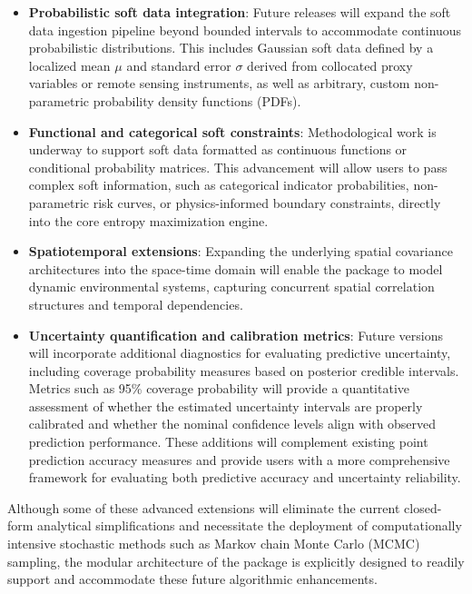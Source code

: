 \begin{itemize}
\item
  \textbf{Probabilistic soft data integration}: Future releases will expand the soft data ingestion pipeline beyond bounded intervals to accommodate continuous probabilistic distributions. This includes Gaussian soft data defined by a localized mean \(\mu\) and standard error \(\sigma\) derived from collocated proxy variables or remote sensing instruments, as well as arbitrary, custom non-parametric probability density functions (PDFs).
\item
  \textbf{Functional and categorical soft constraints}: Methodological work is underway to support soft data formatted as continuous functions or conditional probability matrices. This advancement will allow users to pass complex soft information, such as categorical indicator probabilities, non-parametric risk curves, or physics-informed boundary constraints, directly into the core entropy maximization engine.
\item
  \textbf{Spatiotemporal extensions}: Expanding the underlying spatial covariance architectures into the space-time domain will enable the package to model dynamic environmental systems, capturing concurrent spatial correlation structures and temporal dependencies.
\item
  \textbf{Uncertainty quantification and calibration metrics}: Future versions will incorporate additional diagnostics for evaluating predictive uncertainty, including coverage probability measures based on posterior credible intervals. Metrics such as 95\% coverage probability will provide a quantitative assessment of whether the estimated uncertainty intervals are properly calibrated and whether the nominal confidence levels align with observed prediction performance. These additions will complement existing point prediction accuracy measures and provide users with a more comprehensive framework for evaluating both predictive accuracy and uncertainty reliability.
\end{itemize}

Although some of these advanced extensions will eliminate the current closed-form analytical simplifications and necessitate the deployment of computationally intensive stochastic methods such as Markov chain Monte Carlo (MCMC) sampling, the modular architecture of the package is explicitly designed to readily support and accommodate these future algorithmic enhancements.



